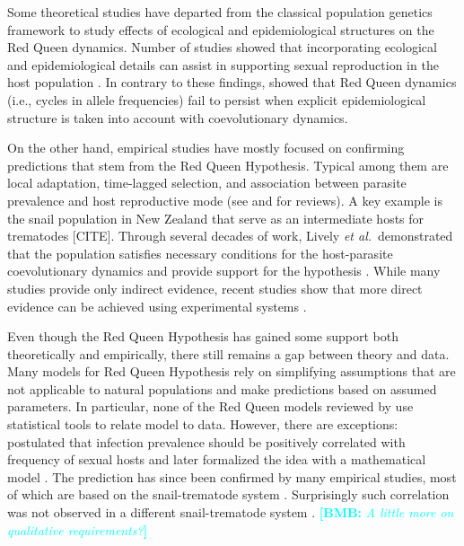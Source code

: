 \documentclass{article}\usepackage[]{graphicx}\usepackage[]{color}
\newcommand{\etal}{\textit{et al.}}
\newcommand{\comment}[3]{\textcolor{#1}{\textbf{[#2: }\textit{#3}\textbf{]}}}
\newcommand{\bmb}[1]{\comment{cyan}{BMB}{#1}}
\begin{document}
Some theoretical studies have departed from the classical population genetics framework to study effects of ecological and epidemiological structures on the Red Queen dynamics.
Number of studies showed that incorporating ecological and epidemiological details can assist in supporting sexual reproduction in the host population \citep{galvani2001antigenic, galvani2003maintenance, lively2009maintenance, lively2010epidemiological}.
In contrary to these findings, \cite{macpherson2017joint} showed that Red Queen dynamics (i.e., cycles in allele frequencies) fail to persist when explicit epidemiological structure is taken into account with coevolutionary dynamics.

On the other hand, empirical studies have mostly focused on confirming predictions that stem from the Red Queen Hypothesis.
Typical among them are local adaptation, time-lagged selection, and association between parasite prevalence and host reproductive mode (see \cite{tobler2008expanding} and \cite{vergara2014infection} for reviews).
A key example is the snail population in New Zealand that serve as an intermediate hosts for trematodes [CITE].
Through several decades of work, Lively \etal\ demonstrated that the population satisfies necessary conditions for the host-parasite coevolutionary dynamics and provide support for the hypothesis \citep{lively1987evidence, lively1989adaptation, dybdahl1995host, dybdahl1998host, jokela2009maintenance, vergara2014infection, gibson2016within}.
While many studies provide only indirect evidence, 
recent studies show that more direct evidence can be achieved using experimental systems \citep{auld2016sex, slowinski2016coevolutionary}.

Even though the Red Queen Hypothesis has gained some support both theoretically and empirically, there still remains a gap between theory and data.
Many models for Red Queen Hypothesis rely on simplifying assumptions that are not applicable to natural populations and make predictions based on assumed parameters.
In particular, none of the Red Queen models reviewed by \cite{ashby2015diversity} use statistical tools to relate model to data.
However, there are exceptions:
\cite{lively1992parthenogenesis} postulated that infection prevalence should be positively correlated with frequency of sexual hosts and later formalized the idea with a mathematical model \citep{lively2001trematode}.
The prediction has since been confirmed by many empirical studies, most of which are based on the snail-trematode system \citep{lively2002temporal, kumpulainen2004parasites, vergara2013geographic, mckone2016fine, gibson2016within}.
Surprisingly such correlation was not observed in a different snail-trematode system \citep{dagan2013clonal}.
\bmb{A little more on qualitative requirements?}
\end{document}
